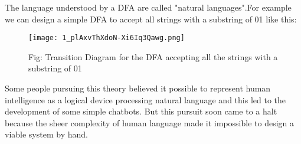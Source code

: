 The language understood by a DFA are called "natural languages".For example we can design a simple DFA to accept all strings with a substring of 01 like this:
\begin{figure}[H]
	\texttt{[image: 1\_plAxvThXdoN-Xi6Iq3Qawg.png]}
	\caption{Fig: Transition Diagram for the DFA accepting all the strings with a substring of 01}
	\label{fig:DFA}
\end{figure}

Some people pursuing this theory believed it possible to represent human intelligence as a logical device processing natural language and this led to the development of some simple chatbots. But this pursuit soon came to a halt because the sheer complexity of human language made it impossible to design a viable system by hand.

%
